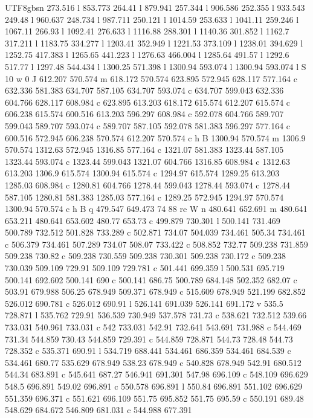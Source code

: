 \documentclass[11pt,a4paper,oneside]{report}
\begin{document}
\begin{CJK*}{UTF8}{gbsn}
{273.516 l 853.773 264.41 l 879.941 257.344 l 906.586 252.355 l 933.543 249.48 l 960.637 248.734 l 987.711
250.121 l 1014.59 253.633 l 1041.11 259.246 l 1067.11 266.93 l 1092.41 276.633 l 1116.88 288.301 l
1140.36 301.852 l 1162.7 317.211 l 1183.75 334.277 l 1203.41 352.949 l 1221.53 373.109 l 1238.01 394.629
l 1252.75 417.383 l 1265.65 441.223 l 1276.63 466.004 l 1285.64 491.57 l 1292.6 517.77 l 1297.48 544.434
l 1300.25 571.398 l 1300.94 593.074 l 1300.94 593.074 l S 10 w 0 J 612.207 570.574 m 618.172 570.574
623.895 572.945 628.117 577.164 c 632.336 581.383 634.707 587.105 634.707 593.074 c 634.707 599.043
632.336 604.766 628.117 608.984 c 623.895 613.203 618.172 615.574 612.207 615.574 c 606.238 615.574
600.516 613.203 596.297 608.984 c 592.078 604.766 589.707 599.043 589.707 593.074 c 589.707 587.105
592.078 581.383 596.297 577.164 c 600.516 572.945 606.238 570.574 612.207 570.574 c h B 1300.94 570.574 m
1306.9 570.574 1312.63 572.945 1316.85 577.164 c 1321.07 581.383 1323.44 587.105 1323.44 593.074 c
1323.44 599.043 1321.07 604.766 1316.85 608.984 c 1312.63 613.203 1306.9 615.574 1300.94 615.574 c
1294.97 615.574 1289.25 613.203 1285.03 608.984 c 1280.81 604.766 1278.44 599.043 1278.44 593.074 c
1278.44 587.105 1280.81 581.383 1285.03 577.164 c 1289.25 572.945 1294.97 570.574 1300.94 570.574 c h B q
479.547 649.473 74 88 re W n 480.641 652.691 m 480.641 653.211 480.641 653.602 480.77 653.73 c 499.879
730.301 l 500.141 731.469 500.789 732.512 501.828 733.289 c 502.871 734.07 504.039 734.461 505.34 734.461
c 506.379 734.461 507.289 734.07 508.07 733.422 c 508.852 732.77 509.238 731.859 509.238 730.82 c 509.238
730.559 509.238 730.301 509.238 730.172 c 509.238 730.039 509.109 729.91 509.109 729.781 c 501.441
699.359 l 500.531 695.719 500.141 692.602 500.141 690 c 500.141 686.75 500.789 684.148 502.352 682.07 c
503.91 679.988 506.25 678.949 509.371 678.949 c 515.609 678.949 521.199 682.852 526.012 690.781 c 526.012
690.91 l 526.141 691.039 526.141 691.172 v 535.5 728.871 l 535.762 729.91 536.539 730.949 537.578 731.73
c 538.621 732.512 539.66 733.031 540.961 733.031 c 542 733.031 542.91 732.641 543.691 731.988 c 544.469
731.34 544.859 730.43 544.859 729.391 c 544.859 728.871 544.73 728.48 544.73 728.352 c 535.371 690.91 l
534.719 688.441 534.461 686.359 534.461 684.539 c 534.461 680.77 535.629 678.949 538.23 678.949 c 540.828
678.949 542.91 680.512 544.34 683.891 c 545.641 687.27 546.941 691.301 547.98 696.109 c 548.109 696.629
548.5 696.891 549.02 696.891 c 550.578 696.891 l 550.84 696.891 551.102 696.629 551.359 696.371 c 551.621
696.109 551.75 695.852 551.75 695.59 c 550.191 689.48 548.629 684.672 546.809 681.031 c 544.988 677.391
}
\end{CJK*}
\end{document}
